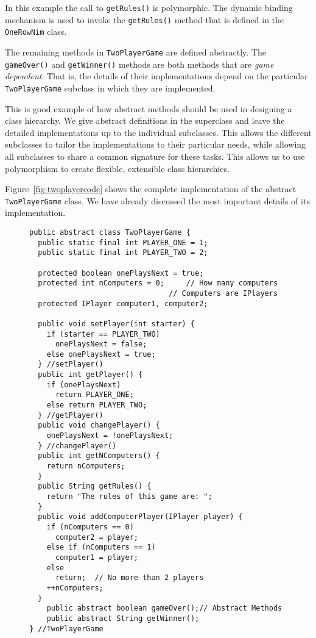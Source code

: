 \noindent In this example the call to {\tt getRules()} is polymorphic.
The dynamic binding mechanism is used to invoke the {\tt getRules()}
method that is defined in the {\tt OneRowNim} class.

The remaining methods in {\tt TwoPlayerGame} are defined abstractly.
The {\tt gameOver()} and {\tt getWinner()} methods are both methods
that are {\em game dependent}. That is, the details of their
implementations depend on the particular {\tt TwoPlayerGame} subclass
in which they are implemented.

This is good example of how abstract methods should be used in
designing a class hierarchy. We give abstract definitions in the
superclass and leave the detailed implementations up to the individual
subclasses.  This allows the different subclasses to tailor the
implementations to their particular needs, while allowing all
subclasses to share a common signature for these tasks.  This
allows us to use polymorphism to create flexible, extensible class
hierarchies.

Figure~\ref{fig-twoplayercode} shows the complete implementation of
the abstract {\tt TwoPlayerGame} class. We have already discussed the
most important details of its implementation.  


\begin{figure}[h!]
\jjjprogstart
\begin{jjjlisting}
\begin{lstlisting}
public abstract class TwoPlayerGame {   
  public static final int PLAYER_ONE = 1;
  public static final int PLAYER_TWO = 2;

  protected boolean onePlaysNext = true;
  protected int nComputers = 0;     // How many computers
                                // Computers are IPlayers
  protected IPlayer computer1, computer2; 
 
  public void setPlayer(int starter) {   
    if (starter == PLAYER_TWO)
      onePlaysNext = false;
    else onePlaysNext = true;
  } //setPlayer()
  public int getPlayer() {   
    if (onePlaysNext) 
      return PLAYER_ONE;
    else return PLAYER_TWO;
  } //getPlayer()
  public void changePlayer() {   
    onePlaysNext = !onePlaysNext;
  } //changePlayer()
  public int getNComputers() {
    return nComputers;
  }
  public String getRules() {
    return "The rules of this game are: ";
  }
  public void addComputerPlayer(IPlayer player) {
    if (nComputers == 0)
      computer2 = player;
    else if (nComputers == 1)
      computer1 = player;
    else 
      return;  // No more than 2 players
    ++nComputers;
  }
    public abstract boolean gameOver();// Abstract Methods
    public abstract String getWinner();
} //TwoPlayerGame
\end{lstlisting}
\end{jjjlisting}
\end{figure}


